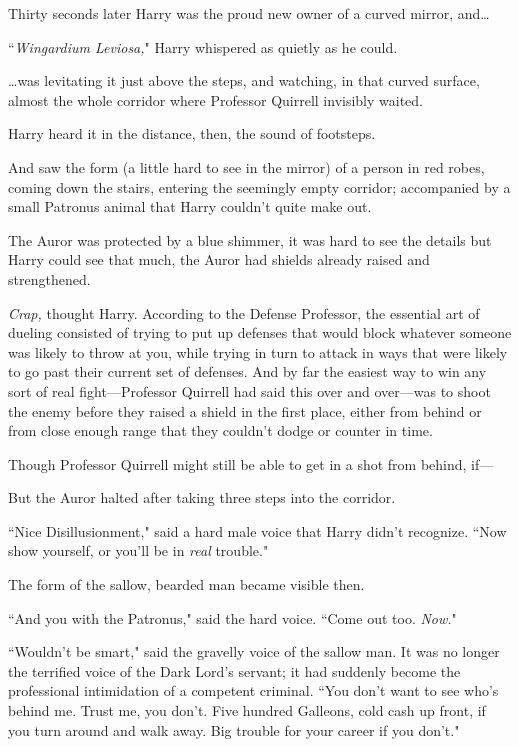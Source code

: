 Thirty seconds later Harry was the proud new owner of a curved mirror, and{\ldots}

``\emph{Wingardium Leviosa,}" Harry whispered as quietly as he could.

{\ldots}was levitating it just above the steps, and watching, in that curved surface, almost the whole corridor where Professor Quirrell invisibly waited.

Harry heard it in the distance, then, the sound of footsteps.

And saw the form (a little hard to see in the mirror) of a person in red robes, coming down the stairs, entering the seemingly empty corridor; accompanied by a small Patronus animal that Harry couldn't quite make out.

The Auror was protected by a blue shimmer, it was hard to see the details but Harry could see that much, the Auror had shields already raised and strengthened.

\emph{Crap,} thought Harry. According to the Defense Professor, the essential art of dueling consisted of trying to put up defenses that would block whatever someone was likely to throw at you, while trying in turn to attack in ways that were likely to go past their current set of defenses. And by far the easiest way to win any sort of real fight—Professor Quirrell had said this over and over—was to shoot the enemy before they raised a shield in the first place, either from behind or from close enough range that they couldn't dodge or counter in time.

Though Professor Quirrell might still be able to get in a shot from behind, if—

But the Auror halted after taking three steps into the corridor.

``Nice Disillusionment," said a hard male voice that Harry didn't recognize. ``Now show yourself, or you'll be in \emph{real} trouble."

The form of the sallow, bearded man became visible then.

``And you with the Patronus," said the hard voice. ``Come out too. \emph{Now.}"

``Wouldn't be smart," said the gravelly voice of the sallow man. It was no longer the terrified voice of the Dark Lord's servant; it had suddenly become the professional intimidation of a competent criminal. ``You don't want to see who's behind me. Trust me, you don't. Five hundred Galleons, cold cash up front, if you turn around and walk away. Big trouble for your career if you don't."

